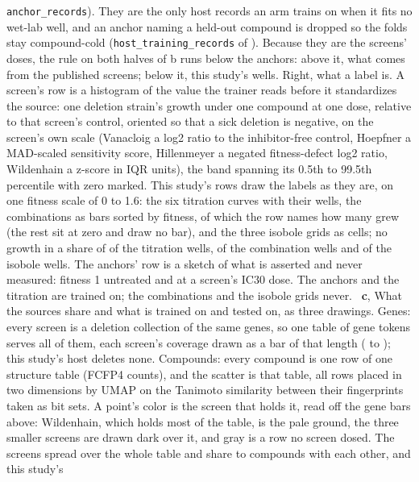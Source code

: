 \texttt{anchor\_records}). They are the only host records an arm trains on when it fits
no wet-lab well, and an anchor naming a held-out compound is dropped so the folds stay
compound-cold (\texttt{host\_training\_records} of ).
Because they are the screens' doses, the rule on both halves
of b runs below the anchors: above it, what comes from the published screens; below it,
this study's wells. Right, what a label is. A screen's row is a histogram of the value
the trainer reads before it standardizes the source: one deletion strain's growth under
one compound at one dose, relative to that screen's control, oriented so that a sick
deletion is negative, on the screen's own scale (Vanacloig a log2 ratio to the
inhibitor-free control, Hoepfner a MAD-scaled sensitivity score, Hillenmeyer a negated
fitness-defect log2 ratio, Wildenhain a z-score in IQR units), the band spanning its
0.5th to 99.5th percentile with zero marked. This study's rows draw the labels as they
are, on one fitness scale of 0 to 1.6: the six titration curves with their wells, the
\hydnCombinations{} combinations as bars sorted by fitness, of which the row names how
many grew (the rest sit at zero and draw no bar), and the three isobole grids as cells; no growth in a share of
\hydlabelNoGrowthHostexTwoOne{} of the titration wells,
\hydlabelNoGrowthHostexTwoThree{} of the combination wells and
\hydlabelNoGrowthHostisobole{} of the isobole wells. The anchors' row is a sketch of
what is asserted and never measured: fitness 1 untreated and \hydicThirtyFitness{} at a
screen's IC30 dose. The anchors and the titration are
trained on; the combinations and the isobole grids never. \,
\textbf{c}, What the sources share and what is trained on and tested on, as three
drawings. Genes: every screen is a deletion collection of the same genes, so one table
of \hydnGeneTokens{} gene tokens serves all of them, each screen's coverage drawn as a
bar of that length (\hydjoinGenesMin{} to \hydjoinGenesMax{}); this study's host
deletes none. Compounds: every compound is one row of one structure table (FCFP4
counts), and the scatter is that table, all \hydjoinCompoundRows{} rows placed in two
dimensions by UMAP on the Tanimoto similarity between their fingerprints taken as bit
sets. A point's color is the screen that holds it, read off the gene bars above:
Wildenhain, which holds most of the table, is the pale ground, the three smaller screens
are drawn dark over it, and gray is a row no screen dosed. The screens spread over the whole table and share
\hydjoinSharedMin{} to \hydjoinSharedMax{} compounds with each other, and this study's
